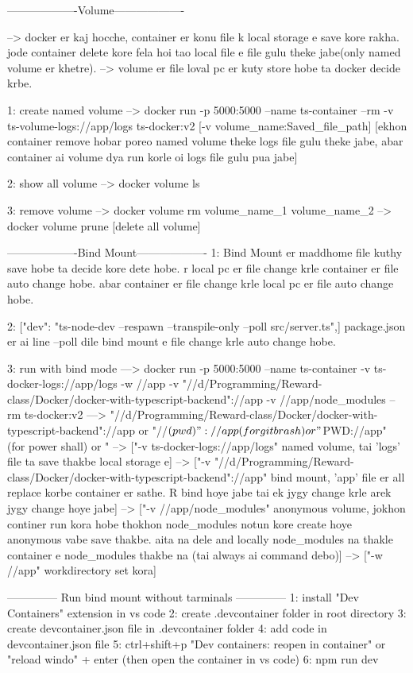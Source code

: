 -------------------Volume-------------------

--> docker er kaj hocche, container er konu file k local storage e save kore rakha. jode container delete kore fela hoi tao local file e file gulu theke jabe(only named volume er khetre).
--> volume er file loval pc er kuty store hobe ta docker decide krbe. 

1: create named volume
--> docker run -p 5000:5000 --name ts-container --rm -v ts-volume-logs://app/logs ts-docker:v2  [-v volume_name:Saved_file_path]
[ekhon container remove hobar poreo named volume theke logs file gulu theke jabe, abar container ai volume dya run korle oi logs file gulu pua jabe]

2: show all volume
--> docker volume ls

3: remove volume
--> docker volume rm volume_name_1 volume_name_2
--> docker volume prune [delete all volume]


-------------------Bind Mount-------------------
1: Bind Mount er maddhome file kuthy save hobe ta decide kore dete hobe. r local pc er file change krle container er file auto change hobe. abar container er file change krle local pc er file auto change hobe.

2: ["dev": "ts-node-dev --respawn --transpile-only --poll src/server.ts",]  package.json er ai line --poll dile bind mount e file change krle auto change hobe.

3: run with bind mode
---> docker run -p 5000:5000 --name ts-container -v ts-docker-logs://app/logs -w //app -v "//d/Programming/Reward-class/Docker/docker-with-typescript-backend"://app -v //app/node_modules --rm ts-docker:v2
---> "//d/Programming/Reward-class/Docker/docker-with-typescript-backend"://app or  "//$(pwd)"://app (for git brash) or "${PWD}://app" (for power shall) or "%
--> ["-v ts-docker-logs://app/logs" named volume, tai 'logs' file ta save thakbe local storage e]
--> ["-v "//d/Programming/Reward-class/Docker/docker-with-typescript-backend"://app" bind mount, 'app' file er all replace korbe container er sathe. R bind hoye jabe tai ek jygy change krle arek jygy change hoye jabe]
--> ["-v //app/node_modules" anonymous volume, jokhon continer run kora hobe thokhon node_modules notun kore create hoye anonymous vabe save thakbe. aita na dele and locally node_modules na thakle container e node_modules thakbe na (tai always ai command debo)]
--> ["-w //app" workdirectory set kora]


-------------- Run bind mount without tarminals --------------
1: install "Dev Containers" extension in vs code
2: create .devcontainer folder in root directory
3: create devcontainer.json file in .devcontainer folder
4: add code in devcontainer.json file
5: ctrl+shift+p "Dev containers: reopen in container" or "reload windo" + enter (then open the container in vs code)
6: npm run dev
